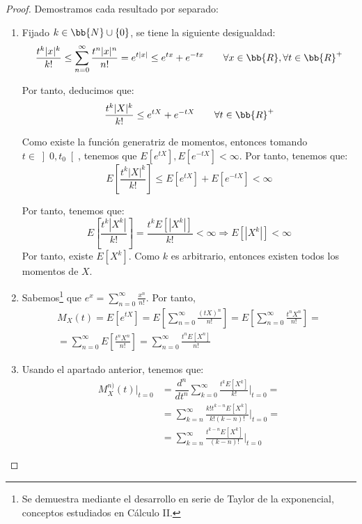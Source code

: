 \begin{proof}
    Demostramos cada resultado por separado:
    \begin{enumerate}
        \item Fijado $k\in \bb{N}\cup \{0\}$, se tiene la siguiente desigualdad:
        \begin{equation*}
            \dfrac{t^k|x|^k}{k!}
            \leq \sum_{n=0}^\infty \dfrac{t^n|x|^n}{n!}
            = e^{t|x|}\leq e^{tx} + e^{-tx}
            \qquad \forall x\in \bb{R}, \forall t\in \bb{R}^+
        \end{equation*}

        Por tanto, deducimos que:
        \begin{equation*}
            \dfrac{t^k |X|^k}{k!}\leq e^{tX} + e^{-tX}\qquad \forall t\in \bb{R}^+
        \end{equation*}

        Como existe la función generatriz de momentos, entonces tomando $t\in \left]0,t_0\right[$, tenemos que $E[e^{tX}], E[e^{-tX}]<\infty$. Por tanto, tenemos que:
        \begin{equation*}
            E\left[\dfrac{t^k |X|^k}{k!}\right] \leq E[e^{tX}] + E[e^{-tX}] < \infty
        \end{equation*}

        Por tanto, tenemos que:
        \begin{equation*}
            E\left[\dfrac{t^k |X^k|}{k!}\right] = \dfrac{t^k E[|X^k|]}{k!} < \infty
            \Longrightarrow
            E[|X^k|] < \infty
        \end{equation*}
        Por tanto, existe $E[X^k]$. Como $k$ es arbitrario, entonces existen todos los momentos de $X$.
        \item Sabemos\footnote{Se demuestra mediante el desarrollo en serie de Taylor de la exponencial, conceptos estudiados en Cálculo II.} que $e^x = \sum\limits_{n=0}^\infty \frac{x^n}{n!}$. Por tanto,
        \begin{multline*}
            M_X(t)=E[e^{tX}]
            = E\left[\sum_{n=0}^\infty \frac{(tX)^n}{n!}\right]
            = E\left[\sum_{n=0}^\infty \frac{t^n X^n}{n!}\right]
            =\\= \sum_{n=0}^\infty E\left[ \frac{t^n X^n}{n!}\right]
            = \sum_{n=0}^\infty \frac{t^n E\left[X^n\right]}{n!}
        \end{multline*}

        \item Usando el apartado anterior, tenemos que:
        \begin{align*}
            M_X^{n)}(t)\Big|_{t=0}
            &= \dfrac{d^n}{dt^n}\sum_{k=0}^\infty \frac{t^k E\left[X^k\right]}{k!}\Big|_{t=0}
            =\\&= \sum_{k=n}^\infty \frac{k!t^{k-n} E\left[X^k\right]}{k!(k-n)!}\Big|_{t=0}
            =\\&= \sum_{k=n}^\infty \frac{t^{k-n} E\left[X^k\right]}{(k-n)!}\Big|_{t=0}
        \end{align*}


\end{enumerate}
\end{proof}
